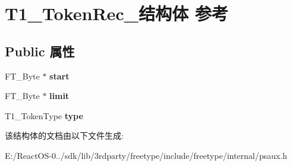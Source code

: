 \hypertarget{struct_t1___token_rec__}{}\section{T1\+\_\+\+Token\+Rec\+\_\+结构体 参考}
\label{struct_t1___token_rec__}
\subsection*{Public 属性}
\begin{DoxyCompactItemize}
\item 
\mbox{\label{struct_t1___token_rec___a1b365e2910220eabf05f925f45bc98d6}} 
F\+T\+\_\+\+Byte $\ast$ {\bfseries start}
\item 
\mbox{\label{struct_t1___token_rec___aacd035f0dfbc47b7e1c7eefbe2c2080c}} 
F\+T\+\_\+\+Byte $\ast$ {\bfseries limit}
\item 
\mbox{\label{struct_t1___token_rec___a88b3b889e74609be1827ead4093a2d52}} 
T1\+\_\+\+Token\+Type {\bfseries type}
\end{DoxyCompactItemize}


该结构体的文档由以下文件生成\+:\begin{DoxyCompactItemize}
\item 
E\+:/\+React\+O\+S-\/0../sdk/lib/3rdparty/freetype/include/freetype/internal/psaux.\+h\end{DoxyCompactItemize}
